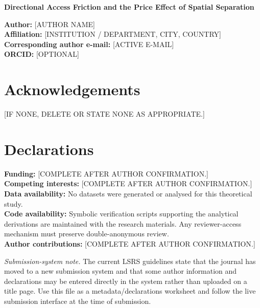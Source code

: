 \documentclass[11pt]{article}
\begin{document}
\begin{center}
{\Large\bfseries Directional Access Friction and the Price Effect of Spatial Separation}
\end{center}

\bigskip

\noindent\textbf{Author:} [AUTHOR NAME]\\
\textbf{Affiliation:} [INSTITUTION / DEPARTMENT, CITY, COUNTRY]\\
\textbf{Corresponding author e-mail:} [ACTIVE E-MAIL]\\
\textbf{ORCID:} [OPTIONAL]

\section*{Acknowledgements}
[IF NONE, DELETE OR STATE NONE AS APPROPRIATE.]

\section*{Declarations}
\textbf{Funding:} [COMPLETE AFTER AUTHOR CONFIRMATION.]\\
\textbf{Competing interests:} [COMPLETE AFTER AUTHOR CONFIRMATION.]\\
\textbf{Data availability:} No datasets were generated or analysed for this theoretical study.\\
\textbf{Code availability:} Symbolic verification scripts supporting the analytical derivations are maintained with the research materials. Any reviewer-access mechanism must preserve double-anonymous review.\\
\textbf{Author contributions:} [COMPLETE AFTER AUTHOR CONFIRMATION.]

\bigskip
\noindent\textit{Submission-system note.} The current LSRS guidelines state that the journal has moved to a new submission system and that some author information and declarations may be entered directly in the system rather than uploaded on a title page. Use this file as a metadata/declarations worksheet and follow the live submission interface at the time of submission.
\end{document}
